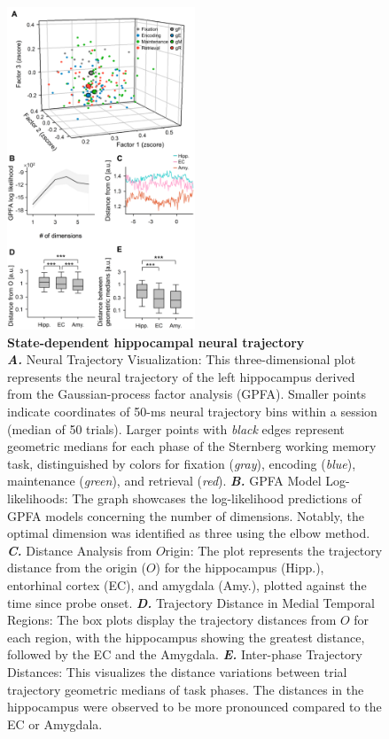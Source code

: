 \documentclass[final,3p,times,twocolumn]{elsarticle}
\begin{document}
        \clearpage
        \begin{figure}[ht]
        	\centering
            \includegraphics[width=0.5\textwidth]{./src/figures/.png/Figure_ID_02.png}
        	\caption{\textbf{
State-dependent hippocampal neural trajectory
}
\smallskip
\\
\textbf{\textit{A.}} Neural Trajectory Visualization: This three-dimensional plot represents the neural trajectory of the left hippocampus derived from the Gaussian-process factor analysis (GPFA). Smaller points indicate coordinates of 50-ms neural trajectory bins within a session (median of 50 trials). Larger points with \textit{black} edges represent geometric medians for each phase of the Sternberg working memory task, distinguished by colors for fixation (\textit{gray}), encoding (\textit{blue}), maintenance (\textit{green}), and retrieval (\textit{red}). \textbf{\textit{B.}}  GPFA Model Log-likelihoods: The graph showcases the log-likelihood predictions of GPFA models concerning the number of dimensions. Notably, the optimal dimension was identified as three using the elbow method. \textbf{\textit{C.}}  Distance Analysis from $O$rigin: The plot represents the trajectory distance from the origin ($O$) for the hippocampus (Hipp.), entorhinal cortex (EC), and amygdala (Amy.), plotted against the time since probe onset. \textbf{\textit{D.}}  Trajectory Distance in Medial Temporal Regions: The box plots display the trajectory distances from $O$ for each region, with the hippocampus showing the greatest distance, followed by the EC and the Amygdala. \textbf{\textit{E.}}  Inter-phase Trajectory Distances: This visualizes the distance variations between trial trajectory geometric medians of task phases. The distances in the hippocampus were observed to be more pronounced compared to the EC or Amygdala.
}
        	\label{fig:02}
        \end{figure}
\end{document}
